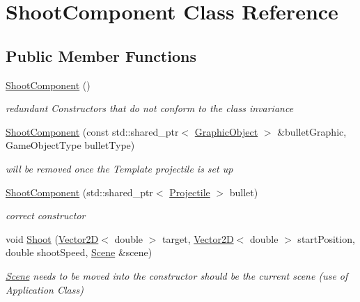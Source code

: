 \hypertarget{class_shoot_component}{}\section{Shoot\+Component Class Reference}
\label{class_shoot_component}
\subsection*{Public Member Functions}
\begin{DoxyCompactItemize}
\item 
\mbox{\label{class_shoot_component_acfbe65399cebcc06d04eeb18807642f5}} 
\hyperlink{class_shoot_component_acfbe65399cebcc06d04eeb18807642f5}{Shoot\+Component} ()
\begin{DoxyCompactList}\small\item\em redundant Constructors that do not conform to the class invariance \end{DoxyCompactList}\item 
\hyperlink{class_shoot_component_a3c0334d147d54522d58a379d6e473006}{Shoot\+Component} (const std\+::shared\+\_\+ptr$<$ \hyperlink{class_graphic_object}{Graphic\+Object} $>$ \&bullet\+Graphic, Game\+Object\+Type bullet\+Type)
\begin{DoxyCompactList}\small\item\em will be removed once the Template projectile is set up \end{DoxyCompactList}\item 
\hyperlink{class_shoot_component_a38ab688c7cf0775b4f15124a1c02bfc7}{Shoot\+Component} (std\+::shared\+\_\+ptr$<$ \hyperlink{class_projectile}{Projectile} $>$ bullet)
\begin{DoxyCompactList}\small\item\em correct constructor \end{DoxyCompactList}\item 
void \hyperlink{class_shoot_component_a27a553ba952e96c77bc6e7d2e5ca9f0a}{Shoot} (\hyperlink{class_vector2_d}{Vector2D}$<$ double $>$ target, \hyperlink{class_vector2_d}{Vector2D}$<$ double $>$ start\+Position, double shoot\+Speed, \hyperlink{class_scene}{Scene} \&scene)
\begin{DoxyCompactList}\small\item\em \hyperlink{class_scene}{Scene} needs to be moved into the constructor should be the current scene (use of Application Class) \end{DoxyCompactList}\end{DoxyCompactItemize}
